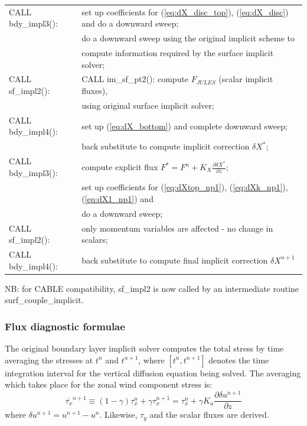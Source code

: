 \documentclass{UMDP_article}
\begin{document}
\begin{center}
{\begin{tabular}{ll} 
CALL bdy\_impl3(): & set up coefficients for (\ref{eq:dX_disc_top}), (\ref{eq:dX_disc}) and do a downward sweep; \\
               & do a downward sweep using the original implicit scheme to \\
               & compute information required by the surface implicit solver; \\
CALL sf\_impl2(): & CALL im\_sf\_pt2(): compute $F_{JULES}$ (scalar implicit fluxes), \\
                  & using original surface implicit solver; \\
CALL bdy\_impl4(): & set up (\ref{eq:dX_bottom}) and complete downward sweep; \\
       & back substitute to compute implicit correction $\delta X^{*}$; \\
CALL bdy\_impl3(): & compute explicit flux 
$F^*=F^n+K_X\frac{\partial \delta X^*}{\partial z}$;  \\
           & set up coefficients for  (\ref{eq:dXtop_np1}), (\ref{eq:dXk_np1}), (\ref{eq:dX1_np1}) and \\
                     & do a downward sweep; \\
CALL sf\_impl2(): & only momentum variables are affected - no change in scalars; \\
CALL bdy\_impl4(): & back substitute to compute final implicit correction $\delta X^{n+1}$ \\
\end{tabular}}
\end{center}
NB: for CABLE compatibility, sf\_impl2 is now called by an
intermediate routine surf\_couple\_implicit.

\subsubsection{Flux diagnostic formulae}

The original boundary layer implicit solver computes the total stress
by time averaging the stresses at $t^{n}$ and $t^{n+1}$, where
$[t^{n},t^{n+1}]$ denotes the time integration interval for the
vertical diffusion equation being solved. The averaging which takes
place for the zonal wind component stress is:
\begin{equation}
  \overline{\tau_{x}}^{n+1}\equiv(1-\gamma)\tau_{x}^{n}+\gamma\tau_{x}^{n+1}
  =\tau_{x}^{n}+\gamma
  K_{u}\frac{\partial\delta u^{n+1}}{\partial z}\label{eq:taux_tot}
\end{equation} 
where $\delta u^{n+1}=u^{n+1}-u^{n}$. Likewise, $\tau_{y}$ and the
scalar fluxes are derived.
\end{document}
